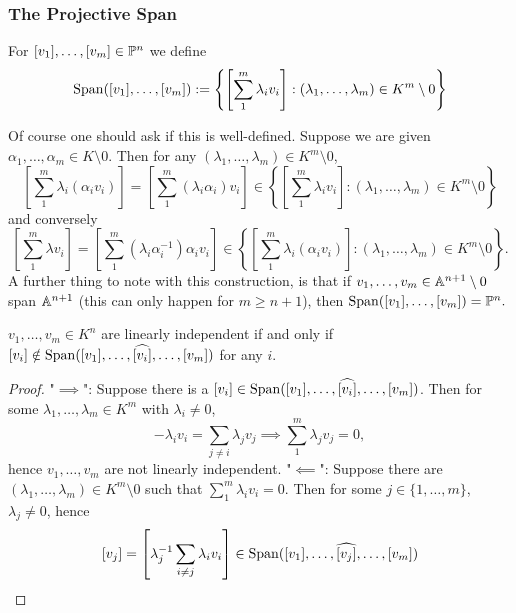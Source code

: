     \subsubsection{The Projective Span}
        \begin{definition}
            For $[v_1],\dots,[v_m]\in\mathbb{P}^n$ we define 
            $$\mathrm{Span}([v_1],\dots,[v_m]):=\left\{\left[\sum_1^m \lambda_iv_i\right] : (\lambda_1,\dots,\lambda_m)\in K^m\setminus 0 \right\}$$
        \end{definition}
        \begin{remark}
            Of course one should ask if this is well-defined. Suppose we are given $\alpha_1,\dots,\alpha_m\in K\setminus 0$. Then for any $(\lambda_1,\dots,\lambda_m)\in K^m\setminus 0$,
            $$
                \left[\sum_1^m \lambda_i(\alpha_i v_i)\right] = \left[\sum_1^m (\lambda_i\alpha_i)v_i\right]\in \left\{\left[\sum_1^m \lambda_iv_i\right] : (\lambda_1,\dots,\lambda_m)\in K^m\setminus 0 \right\} 
            $$
            and conversely 
            $$\left[\sum_1^m \lambda v_i\right] = \left[\sum_1^m (\lambda_i\alpha_i^{-1})\alpha_iv_i\right] \in \left\{\left[\sum_1^m \lambda_i(\alpha_iv_i)\right] : (\lambda_1,\dots,\lambda_m)\in K^m\setminus 0 \right\}.$$
            A further thing to note with this construction, is that if $v_1,\dots,v_m\in \mathbb{A}^{n+1}\setminus 0$ span $\mathbb{A}^{n+1}$ (this can only happen for $m\geq n+1$), then $\mathrm{Span}([v_1],\dots,[v_m])=\mathbb{P}^n.$
        \end{remark}
        \begin{lemma}\label{EquivalentDefinitionOfLinearlyIndependent}
            $v_1,\dots,v_m\in K^n$ are linearly independent if and only if\\ 
            $[v_i]\notin \mathrm{Span}([v_1],\dots,\widehat{[v_i]},\dots,[v_m])$ for any $i$.
        \end{lemma}
        \begin{proof}
            "$\implies$": Suppose there is a $[v_i]\in \mathrm{Span}([v_1],\dots,\widehat{[v_i]},\dots,[v_m])$. Then for some $\lambda_1,\dots,\lambda_m\in K^m$ with $\lambda_i \neq 0$,
            $$-\lambda_i v_i = \sum_{j\neq i} \lambda_jv_j \implies \sum_1^m \lambda_jv_j = 0,$$
            hence $v_1,\dots,v_m$ are not linearly independent. 
            "$\impliedby$": Suppose there are $(\lambda_1,\dots,\lambda_m)\in K^m\setminus 0$ such that $\sum_1^m \lambda_i v_i = 0$. Then for some $j\in\{1,\dots,m\}$, $\lambda_j\neq 0$, hence 
            $$[v_j] = \left[\lambda_j^{-1}\sum_{i\neq j} \lambda_i v_i\right] \in \mathrm{Span}([v_1],\dots,\widehat{[v_j]},\dots, [v_m])$$
        \end{proof}
